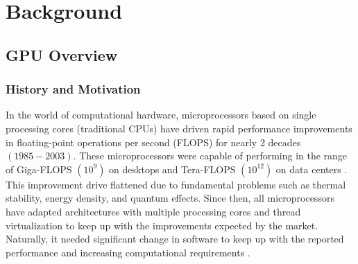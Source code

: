 \chapter{Background}\label{chap:Background}


\section{GPU Overview}\label{GPU-info}
\subsection{History and Motivation}\label{sec:History}
In the world of computational hardware, microprocessors based on single processing cores (traditional CPUs) have driven rapid performance improvements in floating-point operations per second (FLOPS) for nearly 2 decades $(1985-2003)$.
These microprocessors were capable of performing in the range of Giga-FLOPS $(10^9)$ on desktops and Tera-FLOPS $(10^{12})$ on data centers \cite{GPU_book_wen-mei}.
This improvement drive flattened due to fundamental problems such as thermal stability, energy density, and quantum effects.
Since then, all microprocessors have adapted architectures with multiple processing cores and thread virtualization to keep up with the improvements expected by the market. Naturally, it needed significant change in software to keep up with the reported performance and increasing computational requirements \cite{Sutter-multi-core-programming}.

